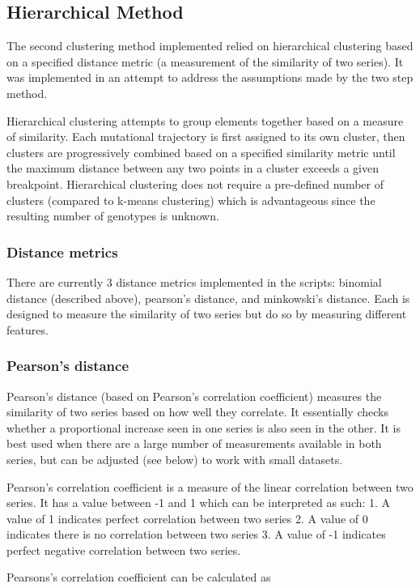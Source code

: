 \documentclass{report}
\begin{document}
\subsection{Hierarchical Method}
The second clustering method implemented relied on hierarchical clustering based on a specified distance metric (a measurement of the similarity of two series). It was implemented in an attempt to address the assumptions made by the two step method.

Hierarchical clustering attempts to group elements together based on a measure of similarity. Each mutational trajectory is first assigned to its own cluster, then clusters are progressively combined based on a specified similarity metric until the maximum distance between any two points in a cluster exceeds a given breakpoint. Hierarchical clustering does not require a pre-defined number of clusters (compared to k-means clustering) which is advantageous since the resulting number of genotypes is unknown.

\subsubsection{Distance metrics}
There are currently 3 distance metrics implemented in the scripts: binomial distance (described above), pearson's distance, and minkowski's distance. Each is designed to measure the similarity of two series but do so by measuring different features.


\subsubsection{Pearson's distance}
Pearson's distance (based on Pearson's correlation coefficient) measures the similarity of two series based on how well they correlate. It essentially checks whether a proportional increase seen in one series is also seen in the other. It is best used when there are a large number of measurements available in both series, but can be adjusted (see below) to work with small datasets.

Pearson's correlation coefficient is a measure of the linear correlation between two series.
It has a value between -1 and 1 which can be interpreted as such:
  1. A value of 1 indicates perfect correlation between two series
  2. A value of 0 indicates there is no correlation between two series
  3. A value of -1 indicates perfect negative correlation between two series.

Pearsons's correlation coefficient can be calculated as
\end{document}
